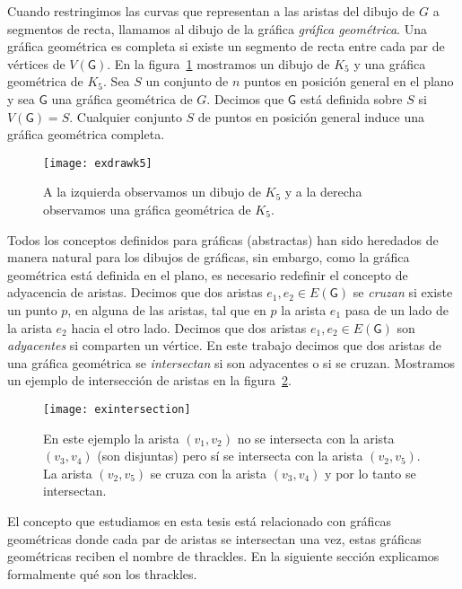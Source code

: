 Cuando restringimos las curvas que representan a las aristas del dibujo de $G$
a segmentos de recta, llamamos al dibujo de la gráfica \emph{gráfica
geométrica}. Una gráfica geométrica es completa si existe un segmento de recta
entre cada par de vértices de $V(\mathsf{G})$. En la figura~\ref{fig:exdrawk5}
mostramos un dibujo de $K_5$ y una gráfica geométrica de $K_5$. Sea $S$ un
conjunto de $n$ puntos en posición general en el plano y sea $\mathsf{G}$
una gráfica geométrica de $G$. Decimos que $\mathsf{G}$ está definida sobre $S$
si $V(\mathsf{G}) = S$. Cualquier conjunto $S$ de puntos en posición general
induce una gráfica geométrica completa.

\begin{figure}[htpb]
  \centering
  \texttt{[image: exdrawk5]}
  \caption{A la izquierda observamos un dibujo de $K_5$ y a la derecha
  observamos una gráfica geométrica de $K_5$.}
  \label{fig:exdrawk5}
\end{figure}

Todos los conceptos definidos para gráficas (abstractas) han sido heredados de
manera natural para los dibujos de gráficas, sin embargo, como la gráfica
geométrica está definida en el plano, es necesario redefinir el concepto de
adyacencia de aristas. Decimos que dos aristas $e_1,e_2 \in E(\mathsf{G})$ se
\emph{cruzan} si existe un punto $p$, en alguna de las aristas, tal que en $p$
la arista $e_1$ pasa de un lado de la arista $e_2$ hacia el otro lado. Decimos
que dos aristas $e_1, e_2 \in E(\mathsf{G})$ son \emph{adyacentes} si comparten
un vértice. En este trabajo decimos que dos aristas de una gráfica geométrica se
\emph{intersectan} si son adyacentes o si se cruzan.
Mostramos un ejemplo de intersección de aristas en la
figura~\ref{fig:exintersection}.
\begin{figure}[htpb]
  \centering
  \texttt{[image: exintersection]}
  \caption{En este ejemplo la arista $(v_1,v_2)$ no se intersecta con la arista
  $(v_3,v_4)$ (son disjuntas) pero sí se intersecta con la arista $(v_2,v_5)$.
  La arista $(v_2,v_5)$ se cruza con la arista $(v_3,v_4)$ y por lo tanto se
  intersectan.}
  \label{fig:exintersection}
\end{figure}

El concepto que estudiamos en esta tesis está relacionado con gráficas
geométricas donde cada par de aristas se intersectan una vez, estas gráficas
geométricas reciben el nombre de thrackles. En la siguiente sección explicamos
formalmente qué son los thrackles.

